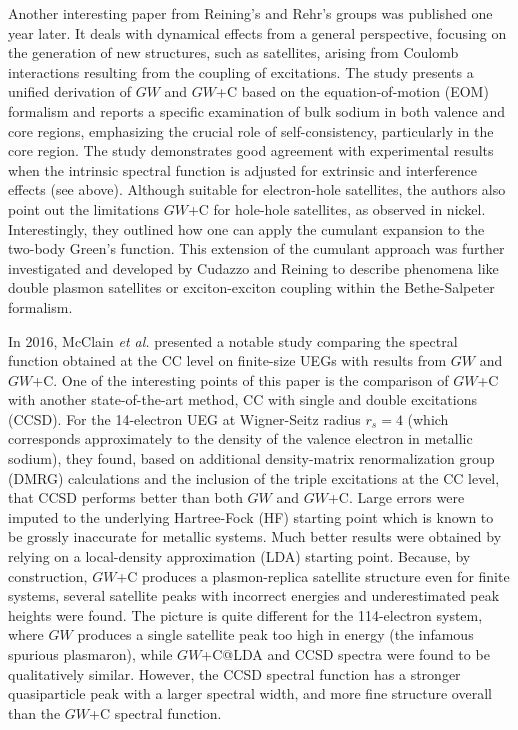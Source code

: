 \documentclass[aip,jcp,reprint,noshowkeys,superscriptaddress]{revtex4-2}
\begin{document}
Another interesting paper from Reining's and Rehr's groups was published one year later. \cite{Zhou_2015} It deals with dynamical effects from a general perspective, focusing on the generation of new structures, such as satellites, arising from Coulomb interactions resulting from the coupling of excitations. The study presents a unified derivation of $GW$ and $GW$+C based on the equation-of-motion (EOM) formalism and reports a specific examination of bulk sodium in both valence and core regions, emphasizing the crucial role of self-consistency, particularly in the core region. The study demonstrates good agreement with experimental results when the intrinsic spectral function is adjusted for extrinsic and interference effects (see above). Although suitable for electron-hole satellites, the authors also point out the limitations $GW$+C for hole-hole satellites, as observed in nickel. \cite{Springer_1998} Interestingly, they outlined how one can apply the cumulant expansion to the two-body Green's function. This extension of the cumulant approach was further investigated and developed by Cudazzo and Reining to describe phenomena like double plasmon satellites or exciton-exciton coupling within the Bethe-Salpeter formalism. \cite{Cudazzo_2020a,Cudazzo_2020b}

In 2016, McClain \textit{et al.} \cite{McClain_2016} presented a notable study comparing the spectral function obtained at the CC level on finite-size UEGs with results from $GW$ and $GW$+C. One of the interesting points of this paper is the comparison of $GW$+C with another state-of-the-art method, CC with single and double excitations (CCSD). For the 14-electron UEG at Wigner-Seitz radius $r_s = 4$ (which corresponds approximately to the density of the valence electron in metallic sodium), they found, based on additional density-matrix renormalization group \cite{Chan_2011,Baiardi_2020} (DMRG) calculations and the inclusion of the triple excitations at the CC level, that CCSD performs better than both $GW$ and $GW$+C. Large errors were imputed to the underlying Hartree-Fock (HF) starting point which is known to be grossly inaccurate for metallic systems. Much better results were obtained by relying on a local-density approximation (LDA) starting point. Because, by construction, $GW$+C produces a plasmon-replica satellite structure even for finite systems, several satellite peaks with incorrect energies and underestimated peak heights were found. The picture is quite different for the 114-electron system, where $GW$ produces a single satellite peak too high in energy (the infamous spurious plasmaron), while $GW$+C@LDA and CCSD spectra were found to be qualitatively similar. However, the CCSD spectral function has a stronger quasiparticle peak with a larger spectral width, and more fine structure overall than the $GW$+C spectral function.
\end{document}
